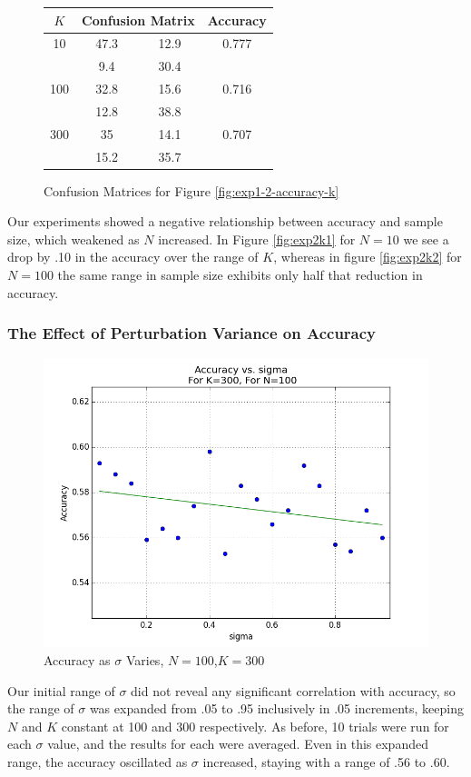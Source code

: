 \documentclass{article}
\begin{document}
\begin{figure}[H]
\centering
\begin{tabular}{|c|c|c|c|}
\hline
$K$&\multicolumn{2}{|c|}{Confusion Matrix}&Accuracy\\
\hline
10&47.3&12.9&0.777\\
\cline{2-3}
&9.4&30.4&\\
\hline
100&32.8&15.6&0.716\\
\cline{2-3}
&12.8&38.8&\\
\hline
300&35&14.1&0.707\\
\cline{2-3}
&15.2&35.7&\\
\hline
\end{tabular}
\caption{Confusion Matrices for Figure \ref{fig:exp1-2-accuracy-k}}\label{fig:cm-exp1-2-accuracy-k}
\end{figure}
Our experiments showed a negative relationship between accuracy and sample size, which weakened as $N$ increased. In Figure \ref{fig:exp2k1} for $N=10$ we see a drop by .10 in the accuracy over the range of $K$, whereas in figure \ref{fig:exp2k2} for $N=100$ the same range in sample size exhibits only half that reduction in accuracy.
\subsubsection{The Effect of Perturbation Variance on Accuracy}
\begin{figure}[H]
    \centering
        \includegraphics[width=\textwidth]{experiment1-2-sigmas.png}
    \caption{Accuracy as $\sigma$ Varies, $N=100$,$K=300$}\label{fig:exp1-2-accuracy-s}
\end{figure}
Our initial range of $\sigma$  did not reveal any significant correlation with accuracy, so the range of $\sigma$ was expanded from .05  to .95 inclusively in .05 increments, keeping $N$ and $K$ constant at 100 and 300 respectively. As before, 10 trials were run for each $\sigma$ value, and the results for each were averaged. Even in this expanded range, the accuracy oscillated as $\sigma$ increased, staying with a range of .56 to .60.
\end{document}
